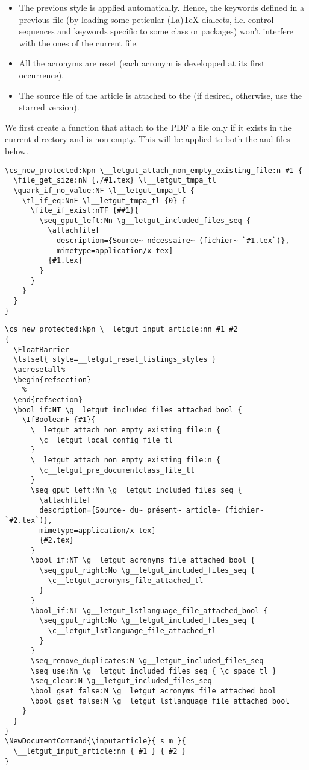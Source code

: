 \documentclass{letgut}
\begin{document}
\begin{itemize}
\item The previous style is applied automatically. Hence, the keywords defined in
a previous file (by loading some peticular (La)\TeX{} dialects, i.e. control
sequences and keywords specific to some class or packages) won't interfere
with the ones of the current file.
\item All the acronyms are reset (each acronym is developped at its first occurrence).
\item The source file of the article is attached to the \pdf{} (if desired,
otherwise, use the starred version).
\end{itemize}

We first create a function that attach to the PDF a file only if it exists in
the current directory and is non empty. This will be applied to both the
 and  files below.

\begin{lstlisting}
\cs_new_protected:Npn \__letgut_attach_non_empty_existing_file:n #1 {
  \file_get_size:nN {./#1.tex} \l__letgut_tmpa_tl
  \quark_if_no_value:NF \l__letgut_tmpa_tl {
    \tl_if_eq:NnF \l__letgut_tmpa_tl {0} {
      \file_if_exist:nTF {##1}{
        \seq_gput_left:Nn \g__letgut_included_files_seq {
          \attachfile[
            description={Source~ nécessaire~ (fichier~ `#1.tex`)},
            mimetype=application/x-tex]
          {#1.tex}
        }
      }
    }
  }
}
\end{lstlisting}

\begin{lstlisting}
\cs_new_protected:Npn \__letgut_input_article:nn #1 #2
{
  \FloatBarrier
  \lstset{ style=__letgut_reset_listings_styles }
  \acresetall%
  \begin{refsection}
    %
  \end{refsection}
  \bool_if:NT \g__letgut_included_files_attached_bool {
    \IfBooleanF {#1}{
      \__letgut_attach_non_empty_existing_file:n {
        \c__letgut_local_config_file_tl
      }
      \__letgut_attach_non_empty_existing_file:n {
        \c__letgut_pre_documentclass_file_tl
      }
      \seq_gput_left:Nn \g__letgut_included_files_seq {
        \attachfile[
        description={Source~ du~ présent~ article~ (fichier~ `#2.tex`)},
        mimetype=application/x-tex]
        {#2.tex}
      }
      \bool_if:NT \g__letgut_acronyms_file_attached_bool {
        \seq_gput_right:No \g__letgut_included_files_seq {
          \c__letgut_acronyms_file_attached_tl
        }
      }
      \bool_if:NT \g__letgut_lstlanguage_file_attached_bool {
        \seq_gput_right:No \g__letgut_included_files_seq {
          \c__letgut_lstlanguage_file_attached_tl
        }
      }
      \seq_remove_duplicates:N \g__letgut_included_files_seq
      \seq_use:Nn \g__letgut_included_files_seq { \c_space_tl }
      \seq_clear:N \g__letgut_included_files_seq
      \bool_gset_false:N \g__letgut_acronyms_file_attached_bool
      \bool_gset_false:N \g__letgut_lstlanguage_file_attached_bool
    }
  }
}
\NewDocumentCommand{\inputarticle}{ s m }{
  \__letgut_input_article:nn { #1 } { #2 }
}
\end{lstlisting}
\end{document}
